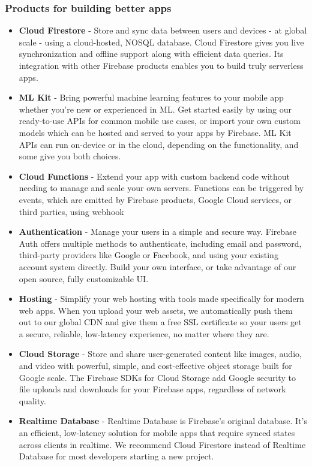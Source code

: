 \newpage
\subsubsection{Products for building better apps}
\begin{itemize}
    \item \textbf{Cloud Firestore} - Store and sync data between users and devices - at global scale - using a cloud-hosted, NOSQL database. Cloud Firestore gives you live synchronization and offline support along with efficient data queries. Its integration with other Firebase products enables you to build truly serverless apps.
    \item \textbf{ML Kit} - Bring powerful machine learning features to your mobile app whether you're new or experienced in ML. Get started easily by using our ready-to-use APIs for common mobile use cases, or import your own custom models which can be hosted and served to your apps by Firebase. ML Kit APIs can run on-device or in the cloud, depending on the functionality, and some give you both choices.
    \item \textbf{Cloud Functions} - Extend your app with custom backend code without needing to manage and scale your own servers. Functions can be triggered by events, which are emitted by Firebase products, Google Cloud services, or third parties, using webhook
    \item \textbf{Authentication} - Manage your users in a simple and secure way. Firebase Auth offers multiple methods to authenticate, including email and password, third-party providers like Google or Facebook, and using your existing account system directly. Build your own interface, or take advantage of our open source, fully customizable UI.
    \item \textbf{Hosting} - Simplify your web hosting with tools made specifically for modern web apps. When you upload your web assets, we automatically push them out to our global CDN and give them a free SSL certificate so your users get a secure, reliable, low-latency experience, no matter where they are.
    \item \textbf{Cloud Storage} - Store and share user-generated content like images, audio, and video with powerful, simple, and cost-effective object storage built for Google scale. The Firebase SDKs for Cloud Storage add Google security to file uploads and downloads for your Firebase apps, regardless of network quality.
    \item \textbf{Realtime Database} - Realtime Database is Firebase's original database. It's an efficient, low-latency solution for mobile apps that require synced states across clients in realtime. We recommend Cloud Firestore instead of Realtime Database for most developers starting a new project.
\end{itemize}

